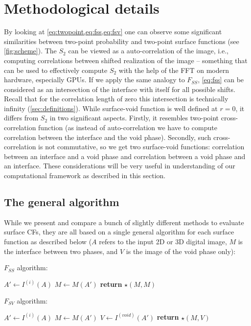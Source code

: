 \documentclass[reprint,amsmath,amssymb,aps,pre,showkeys,showpacs]{revtex4-1}
\begin{document}
\section{Methodological details}
\label{sec:details}
By looking at \cref{eq:twopoint,eq:fss,eq:fsv} one can observe
some significant similarities between two-point probability and two-point
surface functions (see \cref{fig:scheme}). The $S_2$ can be viewed as a
auto-correlation of the image, i.e., computing correlations between shifted
realization of the image -- something that can be used to effectively compute
$S_2$ with the help of the FFT on modern hardware, especially GPUs. If we apply
the same analogy to $F_{SS}$, \cref{eq:fss} can be considered as an intersection
of the interface with itself for all possible shifts. Recall that for the
correlation length of zero this intersection is technically infinity
(\cref{sec:definitions}). While surface-void function is well defined at $r=0$,
it differs from $S_2$ in two significant aspects. Firstly, it resembles two-point
cross-correlation function (as instead of auto-correlation we have to compute
correlation between the interface and the void phase). Secondly, such
cross-correlation is not commutative, so we get two surface-void functions:
correlation between an interface and a void phase and correlation between a void
phase and an interface. These considerations will be very useful in
understanding of our computational framework as described in this section.

\subsection{The general algorithm}
\label{sec:general}
While we present and compare a bunch of slightly different methods to evaluate
surface CFs, they are all based on a single general algorithm for each surface
function as described below ($A$ refers to the input 2D or 3D digital image, $M$
is the interface between two phases, and $V$ is the image of the void phase only):

$F_{SS}$ algorithm:
\begin{algorithmic}[1]
  \State $A' \gets I^{(i)}(A)$
  \State $M \gets M(A')$
  \State \textbf{return} $\star(M, M)$
  \EndProcedure
\end{algorithmic}

$F_{SV}$ algorithm:
\begin{algorithmic}[1]
  \State $A' \gets I^{(i)}(A)$
  \State $M \gets M(A')$
  \State $V \gets I^{(void)}(A')$
  \State \textbf{return} $\star(M, V)$
  \EndProcedure
\end{algorithmic}
\end{document}
